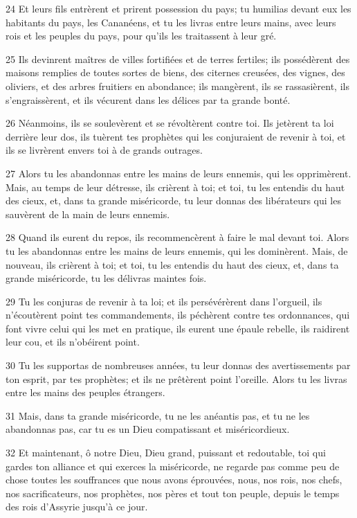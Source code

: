 \par 24 Et leurs fils entrèrent et prirent possession du pays; tu humilias devant eux les habitants du pays, les Cananéens, et tu les livras entre leurs mains, avec leurs rois et les peuples du pays, pour qu'ils les traitassent à leur gré.
\par 25 Ils devinrent maîtres de villes fortifiées et de terres fertiles; ils possédèrent des maisons remplies de toutes sortes de biens, des citernes creusées, des vignes, des oliviers, et des arbres fruitiers en abondance; ils mangèrent, ils se rassasièrent, ils s'engraissèrent, et ils vécurent dans les délices par ta grande bonté.
\par 26 Néanmoins, ils se soulevèrent et se révoltèrent contre toi. Ils jetèrent ta loi derrière leur dos, ils tuèrent tes prophètes qui les conjuraient de revenir à toi, et ils se livrèrent envers toi à de grands outrages.
\par 27 Alors tu les abandonnas entre les mains de leurs ennemis, qui les opprimèrent. Mais, au temps de leur détresse, ils crièrent à toi; et toi, tu les entendis du haut des cieux, et, dans ta grande miséricorde, tu leur donnas des libérateurs qui les sauvèrent de la main de leurs ennemis.
\par 28 Quand ils eurent du repos, ils recommencèrent à faire le mal devant toi. Alors tu les abandonnas entre les mains de leurs ennemis, qui les dominèrent. Mais, de nouveau, ils crièrent à toi; et toi, tu les entendis du haut des cieux, et, dans ta grande miséricorde, tu les délivras maintes fois.
\par 29 Tu les conjuras de revenir à ta loi; et ils persévérèrent dans l'orgueil, ils n'écoutèrent point tes commandements, ils péchèrent contre tes ordonnances, qui font vivre celui qui les met en pratique, ils eurent une épaule rebelle, ils raidirent leur cou, et ils n'obéirent point.
\par 30 Tu les supportas de nombreuses années, tu leur donnas des avertissements par ton esprit, par tes prophètes; et ils ne prêtèrent point l'oreille. Alors tu les livras entre les mains des peuples étrangers.
\par 31 Mais, dans ta grande miséricorde, tu ne les anéantis pas, et tu ne les abandonnas pas, car tu es un Dieu compatissant et miséricordieux.
\par 32 Et maintenant, ô notre Dieu, Dieu grand, puissant et redoutable, toi qui gardes ton alliance et qui exerces la miséricorde, ne regarde pas comme peu de chose toutes les souffrances que nous avons éprouvées, nous, nos rois, nos chefs, nos sacrificateurs, nos prophètes, nos pères et tout ton peuple, depuis le temps des rois d'Assyrie jusqu'à ce jour.
